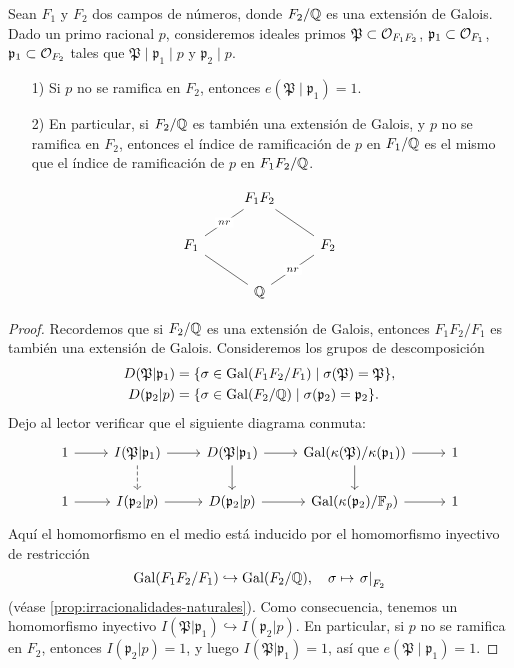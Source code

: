 \begin{lema}
  Sean $F_1$ y $F_2$ dos campos de números, donde $F_2/\mathbb{Q}$ es una extensión de
  Galois. Dado un primo racional $p$, consideremos ideales primos
  $\mathfrak{P} \subset \mathcal{O}_{F_1 F_2}$, $\mathfrak{p}_1 \subset \mathcal{O}_{F_1}$,
  $\mathfrak{p}_1 \subset \mathcal{O}_{F_2}$ tales que
  $\mathfrak{P} \mid \mathfrak{p}_1 \mid p$ y $\mathfrak{p}_2 \mid p$.

  \begin{enumerate}
  \item[1)] Si $p$ no se ramifica en $F_2$, entonces
    $e (\mathfrak{P} \mid \mathfrak{p}_1) = 1$.

  \item[2)] En particular, si $F_2/\mathbb{Q}$ es también una extensión de Galois,
    y $p$ no se ramifica en $F_2$, entonces el índice de ramificación de $p$ en
    $F_1/\mathbb{Q}$ es el mismo que el índice de ramificación de $p$ en $F_1 F_2/\mathbb{Q}$.
  \end{enumerate}

  \[ \begin{tikzcd}
    & F_1 F_2\ar[-]{dl}[description]{nr}\ar[-]{dr} \\
    F_1\ar[-]{dr} & & F_2\ar[-]{dl}[description]{nr} \\
    & \QQ
  \end{tikzcd} \]

  \begin{proof}
    Recordemos que si $F_2/\mathbb{Q}$ es una extensión de Galois, entonces
    $F_1 F_2/F_1$ es también una extensión de Galois. Consideremos los grupos
    de descomposición
    \begin{align*}
      D (\mathfrak{P}|\mathfrak{p}_1) & = \{ \sigma \in \operatorname{Gal} (F_1 F_2/F_1) \mid \sigma (\mathfrak{P}) = \mathfrak{P} \}, \\
      D (\mathfrak{p}_2|p) & = \{ \sigma \in \operatorname{Gal} (F_2/\mathbb{Q}) \mid \sigma (\mathfrak{p}_2) = \mathfrak{p}_2 \}.
    \end{align*}
    Dejo al lector verificar que el siguiente diagrama conmuta:
    \[ \begin{tikzcd}
      1 \ar{r} & I (\mathfrak{P}|\mathfrak{p}_1)\ar[dashed]{d}\ar{r} & D (\mathfrak{P}|\mathfrak{p}_1) \ar{r}\ar{d} & \Gal (\kappa(\mathfrak{P})/\kappa(\mathfrak{p}_1)) \ar{r}\ar{d} & 1 \\
      1 \ar{r} & I (\mathfrak{p}_2|p)\ar{r} & D (\mathfrak{p}_2|p) \ar{r} & \Gal (\kappa(\mathfrak{p}_2)/\FF_p) \ar{r} & 1
    \end{tikzcd} \]
    Aquí el homomorfismo en el medio está inducido por el homomorfismo
    inyectivo de restricción
    \[ \operatorname{Gal} (F_1 F_2/F_1) \hookrightarrow \operatorname{Gal} (F_2/\mathbb{Q}),
    \quad \sigma \mapsto \left.\sigma\right|_{F_2} \]
    (véase \ref{prop:irracionalidades-naturales}). Como consecuencia, tenemos
    un homomorfismo inyectivo
    $I (\mathfrak{P}|\mathfrak{p}_1) \hookrightarrow I (\mathfrak{p}_2|p)$.
    En particular, si $p$ no se ramifica en $F_2$, entonces
    $I (\mathfrak{p}_2|p) = 1$, y luego $I (\mathfrak{P}|\mathfrak{p}_1) = 1$,
    así que $e (\mathfrak{P} \mid \mathfrak{p}_1) = 1$.


\end{proof}
\end{lema}
